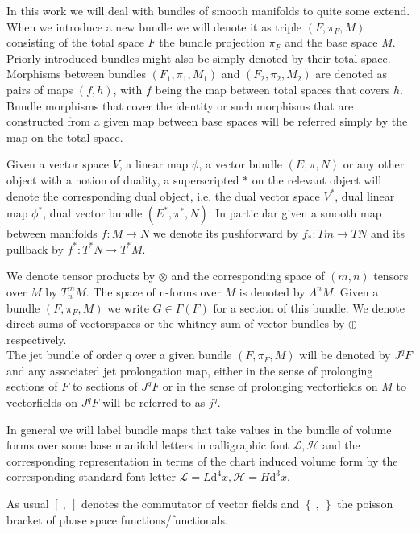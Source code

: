 \documentclass[a4paper,12pt, DIV=14, BCOR=5mm, twoside, headsepline]{scrbook}
\begin{document}
In this work we will deal with bundles of smooth manifolds to quite some extend. When we introduce a new bundle we will denote it as triple $(F,\pi_F,M)$ consisting of the total space $F$ the bundle projection $\pi_F$ and the base space $M$. Priorly introduced bundles might also be simply denoted by their total space. Morphisms between bundles $(F_1,\pi_1,M_1)$ and $(F_2,\pi_2,M_2)$ are denoted as pairs of maps $(f,h)$, with $f$ being the map between total spaces that covers $h$. Bundle morphisms that cover the identity or such morphisms that are constructed from a given map between base spaces will be referred simply by the map on the total space.

Given a vector space $V$, a linear map $\phi$, a vector bundle $(E,\pi,N)$ or any other object with a notion of duality, a superscripted $\ast$ on the relevant object will denote the corresponding dual object, i.e. the dual vector space $V^{\ast}$, dual linear map $\phi^{\ast}$, dual vector bundle $(E^{\ast}, \pi^{\ast},N)$. In particular given a smooth map between manifolds $f : M \rightarrow N$ we denote its pushforward by $f_{\ast} : Tm \rightarrow TN$ and its pullback by $f^{\ast} : T^{\ast}N \rightarrow T^{\ast}M$.

We denote tensor products by $\otimes$ and the corresponding space of $(m,n)$ tensors over $M$ by $T^m_nM$. The space of n-forms over $M$ is denoted by $\Lambda^nM$. Given a bundle $(F,\pi_{F},M)$ we write $G \in \Gamma(F) $ for a section of this bundle. We denote direct sums of vectorspaces or the whitney sum of vector bundles by $\oplus$ respectively. \\

The jet bundle of order q over a given bundle $(F,\pi_F,M)$ will be denoted by $J^qF$ and any associated jet prolongation map, either in the sense of prolonging sections of $F$ to sections of $J^qF$ or in the sense of prolonging vectorfields on $M$ to vectorfields on $J^qF$ will be referred to as $j^q$. 

In general we will label bundle maps that take values in the bundle of volume forms over some base manifold letters in calligraphic font $\mathcal{L}, \mathcal{H}$ and the corresponding representation in terms of the chart induced volume form by the corresponding standard font letter $\mathcal{L}=L \mathrm{d}^4x, \mathcal{H}= H \mathrm{d}^3x$.

As usual $\left[ \  ,   \  \right]$ denotes the commutator of vector fields and $\left \{  \  ,   \   \right \}$ the poisson bracket of phase space functions/functionals. 
\end{document}
